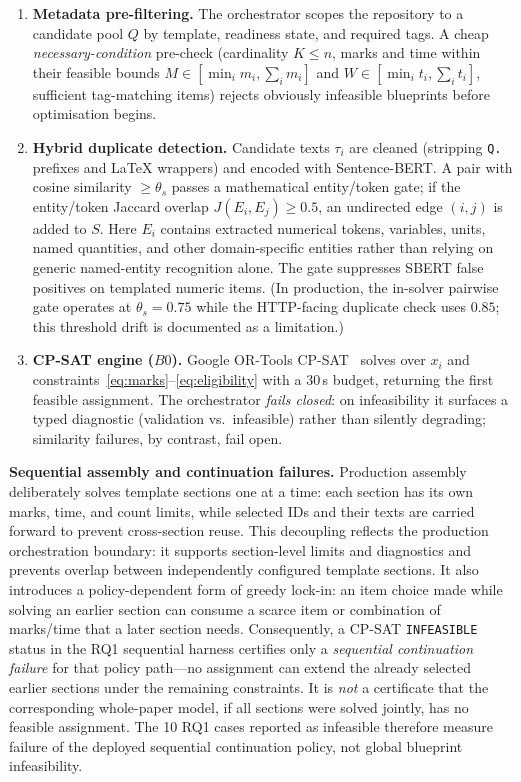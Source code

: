 \documentclass[runningheads]{llncs}
\begin{document}
\begin{enumerate}
    \item \textbf{Metadata pre-filtering.} The orchestrator scopes the repository to a candidate pool $Q$ by template, readiness state, and required tags.
A cheap \emph{necessary-condition} pre-check (cardinality $K\le n$, marks and time within their feasible bounds $M\in[\min_i m_i,\sum_i m_i]$ and $W\in[\min_i t_i,\sum_i t_i]$, sufficient tag-matching items) rejects obviously infeasible blueprints before optimisation begins.
    \item \textbf{Hybrid duplicate detection.} Candidate texts $\tau_i$ are cleaned (stripping \texttt{Q.} prefixes and \LaTeX{} wrappers) and encoded with Sentence-BERT.
A pair with cosine similarity $\ge\theta_s$ passes a mathematical entity/token gate;
if the entity/token Jaccard overlap $J(E_i,E_j)\ge 0.5$, an undirected edge $(i,j)$ is added to $S$.
Here $E_i$ contains extracted numerical tokens, variables, units, named quantities, and other domain-specific entities rather than relying on generic named-entity recognition alone.
The gate suppresses SBERT false positives on templated numeric items.
(In production, the in-solver pairwise gate operates at $\theta_s{=}0.75$ while the HTTP-facing duplicate check uses $0.85$; this threshold drift is documented as a limitation.)
    \item \textbf{CP-SAT engine ($B0$).} Google OR-Tools CP-SAT~\cite{ortools} solves over $x_i$ and constraints~\eqref{eq:marks}--\eqref{eq:eligibility} with a 30\,s budget, returning the first feasible assignment.
The orchestrator \emph{fails closed}: on infeasibility it surfaces a typed diagnostic (validation vs.\ infeasible) rather than silently degrading;
similarity failures, by contrast, fail open.
\end{enumerate}

\noindent\textbf{Sequential assembly and continuation failures.} Production assembly deliberately solves template sections one at a time: each section has its own marks, time, and count limits, while selected IDs and their texts are carried forward to prevent cross-section reuse.
This decoupling reflects the production orchestration boundary: it supports section-level limits and diagnostics and prevents overlap between independently configured template sections.
It also introduces a policy-dependent form of greedy lock-in: an item choice made while solving an earlier section can consume a scarce item or combination of marks/time that a later section needs.
Consequently, a CP-SAT \texttt{INFEASIBLE} status in the RQ1 sequential harness certifies only a \emph{sequential continuation failure} for that policy path---no assignment can extend the already selected earlier sections under the remaining constraints.
It is \emph{not} a certificate that the corresponding whole-paper model, if all sections were solved jointly, has no feasible assignment.
The 10 RQ1 cases reported as infeasible therefore measure failure of the deployed sequential continuation policy, not global blueprint infeasibility.
\end{document}
